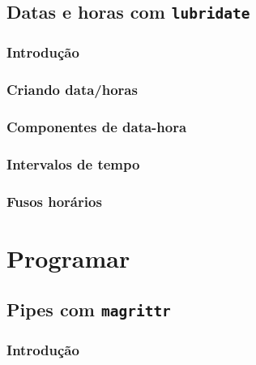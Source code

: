 \documentclass[
]{latex/krantz}
\theoremstyle{definition}
\theoremstyle{definition}
\theoremstyle{definition}
\theoremstyle{definition}
\theoremstyle{remark}
\begin{document}
\hypertarget{datas-e-horas-com-lubridate}{%
\chapter{\texorpdfstring{Datas e horas com \texttt{lubridate}}{Datas e horas com lubridate}}\label{datas-e-horas-com-lubridate}}

\hypertarget{introduuxe7uxe3o-9}{%
\section{Introdução}\label{introduuxe7uxe3o-9}}

\hypertarget{criando-datahoras}{%
\section{Criando data/horas}\label{criando-datahoras}}

\hypertarget{componentes-de-data-hora}{%
\section{Componentes de data-hora}\label{componentes-de-data-hora}}

\hypertarget{intervalos-de-tempo}{%
\section{Intervalos de tempo}\label{intervalos-de-tempo}}

\hypertarget{fusos-horuxe1rios}{%
\section{Fusos horários}\label{fusos-horuxe1rios}}

\hypertarget{part-programar}{%
\part{Programar}\label{part-programar}}

\hypertarget{pipes-com-magrittr}{%
\chapter{\texorpdfstring{Pipes com \texttt{magrittr}}{Pipes com magrittr}}\label{pipes-com-magrittr}}

\hypertarget{introduuxe7uxe3o-10}{%
\section{Introdução}\label{introduuxe7uxe3o-10}}
\end{document}
